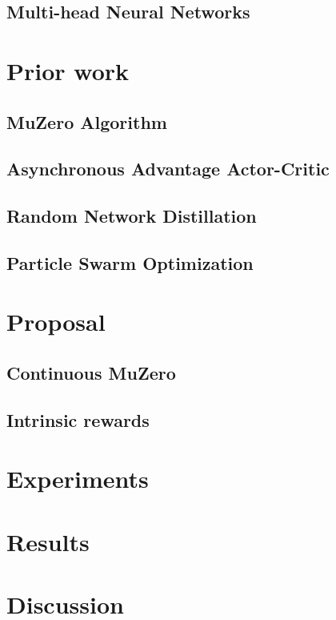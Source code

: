 \documentclass{article}
\begin{document}
\subsection{Multi-head Neural Networks}

\section{Prior work}
\subsection{MuZero Algorithm}
\subsection{Asynchronous Advantage Actor-Critic}
\subsection{Random Network Distillation}
\subsection{Particle Swarm Optimization}

\section{Proposal}
\subsection{Continuous MuZero}
\subsection{Intrinsic rewards}

\section{Experiments}

\section{Results}

\section{Discussion}



\end{document}
